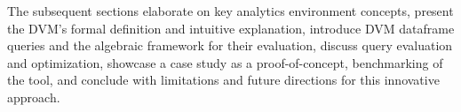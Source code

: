 The subsequent sections elaborate on key analytics environment concepts, present the DVM's formal definition and intuitive explanation, introduce DVM dataframe queries and the algebraic framework for their evaluation, discuss query evaluation and optimization, showcase a case study as a proof-of-concept, benchmarking of the tool, and conclude with limitations and future directions for this innovative approach.